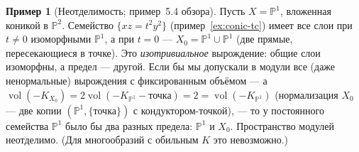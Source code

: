 \documentclass[11pt,a4paper]{article}
\theoremstyle{plain}
\theoremstyle{definition}
\newtheorem{example}[theorem]{Пример}
\theoremstyle{remark}
\newcommand{\PP}{\mathbb{P}}
\DeclareMathOperator{\vol}{vol}
\begin{document}
\begin{example}[Неотделимость; пример~5.4 обзора]\label{ex:nonseparated}
Пусть $X=\PP^1$, вложенная коникой в $\PP^2$. Семейство $\{xz=t^2y^2\}$ (пример~\ref{ex:conic-tc})
имеет все слои при $t\ne0$ изоморфными $\PP^1$, а при $t=0$ --- $X_0=\PP^1\cup\PP^1$ (две прямые,
пересекающиеся в точке). Это \emph{изотривиальное} вырождение: общие слои изоморфны, а предел ---
другой. Если бы мы допускали в модули все (даже ненормальные) вырождения с фиксированным объёмом
--- а $\vol(-K_{X_0})=2\vol(-K_{\PP^1}-\text{точка})=2=\vol(-K_{\PP^1})$ (нормализация $X_0$ --- две
копии $(\PP^1,\{\text{точка}\})$ с кондуктором-точкой), --- то у постоянного семейства $\PP^1$ было бы
два разных предела: $\PP^1$ и $X_0$. Пространство модулей неотделимо. (Для многообразий с обильным
$K$ это невозможно.)
\end{example}
\end{document}
